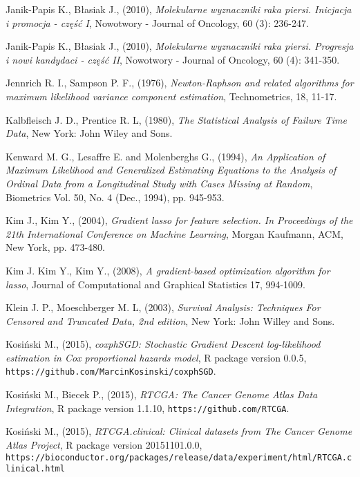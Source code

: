 \begin{thebibliography}{99}
 Janik-Papis K., Błasiak J., (2010), \textit{Molekularne wyznaczniki raka piersi. Inicjacja i promocja - część I}, Nowotwory - Journal of Oncology, 60 (3): 236-247.

 Janik-Papis K., Błasiak J., (2010), \textit{Molekularne wyznaczniki raka piersi. Progresja i nowi kandydaci - część II}, Nowotwory - Journal of Oncology, 60 (4): 341-350.

 Jennrich R. I., Sampson P. F., (1976), \textit{Newton-Raphson and related algorithms for maximum likelihood variance component estimation}, Technometrics, 18, 11-17.


 Kalbfleisch J. D., Prentice R. L, (1980), \textit{The Statistical Analysis of Failure Time Data}, New York: John Wiley and Sons. 

 Kenward M. G., Lesaffre E. and Molenberghs G., (1994), \textit{An Application of Maximum Likelihood and Generalized Estimating Equations to the Analysis of Ordinal Data from a Longitudinal Study with Cases Missing at Random}, Biometrics Vol. 50, No. 4 (Dec., 1994), pp. 945-953.

 Kim J., Kim Y., (2004), \textit{Gradient lasso for feature selection. In Proceedings of the
21th International Conference on Machine Learning}, Morgan Kaufmann, ACM, New York, pp. 473-480.

 Kim J. Kim Y., Kim Y., (2008), \textit{A gradient-based optimization algorithm for lasso},  Journal of Computational and Graphical Statistics 17, 994-1009.

 Klein J. P., Moeschberger M. L, (2003), \textit{Survival Analysis: Techniques For Censored and Truncated Data, 2nd edition}, New York: John Willey and Sons.


 Kosiński M., (2015), \textit{coxphSGD: Stochastic Gradient Descent log-likelihood estimation in Cox proportional hazards model}, R package version 0.0.5,  \texttt{https://github.com/MarcinKosinski/coxphSGD}.

 Kosiński M., Biecek P., (2015), \textit{RTCGA: The Cancer Genome Atlas Data Integration}, R package version 1.1.10, \texttt{https://github.com/RTCGA}.

 Kosiński M., (2015), \textit{RTCGA.clinical: Clinical datasets from The Cancer Genome Atlas Project}, R package version 20151101.0.0, \\ \texttt{https://bioconductor.org/packages/release/data/experiment/html/RTCGA.clinical.html}


\end{thebibliography}

